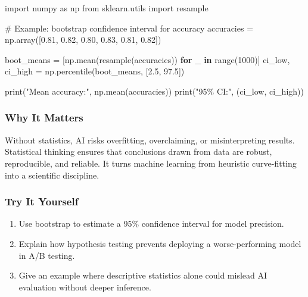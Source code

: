 \documentclass[
  letterpaper,
  DIV=11,
  numbers=noendperiod]{scrreprt}
\newenvironment{Shaded}{\begin{snugshade}}{\end{snugshade}}
\newcommand{\BuiltInTok}[1]{\textcolor[rgb]{0.00,0.23,0.31}{#1}}
\newcommand{\CommentTok}[1]{\textcolor[rgb]{0.37,0.37,0.37}{#1}}
\newcommand{\ControlFlowTok}[1]{\textcolor[rgb]{0.00,0.23,0.31}{\textbf{#1}}}
\newcommand{\DecValTok}[1]{\textcolor[rgb]{0.68,0.00,0.00}{#1}}
\newcommand{\FloatTok}[1]{\textcolor[rgb]{0.68,0.00,0.00}{#1}}
\newcommand{\ImportTok}[1]{\textcolor[rgb]{0.00,0.46,0.62}{#1}}
\newcommand{\KeywordTok}[1]{\textcolor[rgb]{0.00,0.23,0.31}{\textbf{#1}}}
\newcommand{\NormalTok}[1]{\textcolor[rgb]{0.00,0.23,0.31}{#1}}
\newcommand{\OperatorTok}[1]{\textcolor[rgb]{0.37,0.37,0.37}{#1}}
\newcommand{\StringTok}[1]{\textcolor[rgb]{0.13,0.47,0.30}{#1}}
\providecommand{\tightlist}{%
  \setlength{\itemsep}{0pt}\setlength{\parskip}{0pt}}
\begin{document}
\begin{Shaded}
\begin{Highlighting}[]
\ImportTok{import}\NormalTok{ numpy }\ImportTok{as}\NormalTok{ np}
\ImportTok{from}\NormalTok{ sklearn.utils }\ImportTok{import}\NormalTok{ resample}

\CommentTok{\# Example: bootstrap confidence interval for accuracy}
\NormalTok{accuracies }\OperatorTok{=}\NormalTok{ np.array([}\FloatTok{0.81}\NormalTok{, }\FloatTok{0.82}\NormalTok{, }\FloatTok{0.80}\NormalTok{, }\FloatTok{0.83}\NormalTok{, }\FloatTok{0.81}\NormalTok{, }\FloatTok{0.82}\NormalTok{])}

\NormalTok{boot\_means }\OperatorTok{=}\NormalTok{ [np.mean(resample(accuracies)) }\ControlFlowTok{for}\NormalTok{ \_ }\KeywordTok{in} \BuiltInTok{range}\NormalTok{(}\DecValTok{1000}\NormalTok{)]}
\NormalTok{ci\_low, ci\_high }\OperatorTok{=}\NormalTok{ np.percentile(boot\_means, [}\FloatTok{2.5}\NormalTok{, }\FloatTok{97.5}\NormalTok{])}

\BuiltInTok{print}\NormalTok{(}\StringTok{"Mean accuracy:"}\NormalTok{, np.mean(accuracies))}
\BuiltInTok{print}\NormalTok{(}\StringTok{"95\% CI:"}\NormalTok{, (ci\_low, ci\_high))}
\end{Highlighting}
\end{Shaded}

\subsubsection{Why It Matters}\label{why-it-matters-37}

Without statistics, AI risks overfitting, overclaiming, or
misinterpreting results. Statistical thinking ensures that conclusions
drawn from data are robust, reproducible, and reliable. It turns machine
learning from heuristic curve-fitting into a scientific discipline.

\subsubsection{Try It Yourself}\label{try-it-yourself-139}

\begin{enumerate}
\def\labelenumi{\arabic{enumi}.}
\tightlist
\item
  Use bootstrap to estimate a 95\% confidence interval for model
  precision.
\item
  Explain how hypothesis testing prevents deploying a worse-performing
  model in A/B testing.
\item
  Give an example where descriptive statistics alone could mislead AI
  evaluation without deeper inference.
\end{enumerate}
\end{document}
